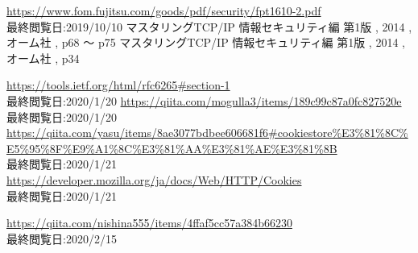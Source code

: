 \def\line{−\hspace*{-.7zw}−}

\begin{thebibliography}{99}



 \url{https://www.fom.fujitsu.com/goods/pdf/security/fpt1610-2.pdf} \\最終閲覧日:2019/10/10
 マスタリングTCP/IP 情報セキュリティ編 第1版 , 2014 , オーム社 , p68 〜 p75 
 マスタリングTCP/IP 情報セキュリティ編 第1版 , 2014 , オーム社 , p34 



 \url{https://tools.ietf.org/html/rfc6265#section-1} \\ 最終閲覧日:2020/1/20
 \url{https://qiita.com/mogulla3/items/189c99c87a0fc827520e} \\ 最終閲覧日:2020/1/20
 \url{https://qiita.com/yasu/items/8ae3077bdbee606681f6#cookiestore%E3%81%8C%E5%95%8F%E9%A1%8C%E3%81%AA%E3%81%AE%E3%81%8B} \\ 最終閲覧日:2020/1/21
 \url{https://developer.mozilla.org/ja/docs/Web/HTTP/Cookies} \\最終閲覧日:2020/1/21



 \url{https://qiita.com/nishina555/items/4ffaf5cc57a384b66230} \\ 最終閲覧日:2020/2/15

\end{thebibliography}


